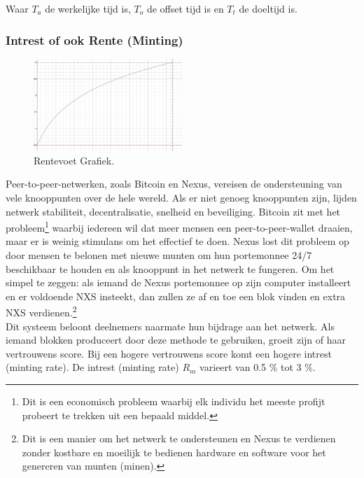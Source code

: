\documentclass[11pt]{article}
\begin{document}
\begin{center}
Waar $T_a$ de werkelijke tijd is, $T_o$ de offset tijd is en $T_t$ de doeltijd is.\\
\end{center}


\subsubsection{Intrest of ook Rente (Minting)}

\begin{figure}\label{fig:interestrate} %
    \centering
    \includegraphics[width=0.50\textwidth]{interest.png}
    \caption{Rentevoet Grafiek.}
\end{figure}

Peer-to-peer-netwerken, zoals Bitcoin en Nexus, vereisen de ondersteuning van vele knooppunten over de hele wereld. Als er niet genoeg knooppunten zijn, lijden netwerk stabiliteit, decentralisatie, snelheid en beveiliging. Bitcoin zit met het probleem\footnote{Dit is een economisch probleem waarbij elk individu het meeste profijt probeert te trekken uit een bepaald middel\cite{tragedycommons}.}
\noindent waarbij iedereen wil dat meer mensen een peer-to-peer-wallet draaien, maar er is weinig stimulans om het effectief te doen. Nexus lost dit probleem op door mensen te belonen met nieuwe munten om hun portemonnee 24/7 beschikbaar te houden en als knooppunt in het netwerk te fungeren. Om het simpel te zeggen: als iemand de Nexus portemonnee op zijn computer installeert en er voldoende NXS insteekt, dan zullen ze af en toe een blok vinden en extra NXS verdienen.\footnote{ Dit is een manier om het netwerk te ondersteunen en Nexus te verdienen zonder kostbare en moeilijk te bedienen hardware en software voor het genereren van munten (minen).}\\

\noindent Dit systeem beloont deelnemers naarmate hun bijdrage aan het netwerk. Als iemand blokken produceert door deze methode te gebruiken, groeit zijn of haar vertrouwens score. Bij een hogere vertrouwens score komt een hogere intrest (minting rate). De intrest (minting rate) $R_m$ varieert van 0.5 \% tot 3 \%.
\end{document}
